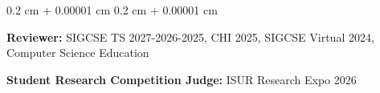 \documentclass[10pt, letterpaper]{article}
\newenvironment{highlights}{
    \begin{itemize}[
        topsep=0.10 cm,
        parsep=0.10 cm,
        partopsep=0pt,
        itemsep=0pt,
        leftmargin=0.4 cm + 10pt
    ]
}{
    \end{itemize}
} %
\newenvironment{onecolentry}{
    \begin{adjustwidth}{
        0.2 cm + 0.00001 cm
    }{
        0.2 cm + 0.00001 cm
    }
}{
    \end{adjustwidth}
} %
\newenvironment{twocolentry}[2][]{
    \onecolentry
    \def\secondColumn{#2}
    \setcolumnwidth{\fill, 4.5 cm}
    \begin{paracol}{2}
}{
    \switchcolumn \raggedleft \secondColumn
    \end{paracol}
    \endonecolentry
} %
\begin{document}
            
            



            
            


        \begin{onecolentry}
            
            \textbf{Reviewer:} SIGCSE TS 2027-2026-2025, CHI 2025, SIGCSE Virtual 2024, Computer Science Education
            
            \textbf{Student Research Competition Judge:} ISUR Research Expo 2026
        \end{onecolentry}
\end{document}
